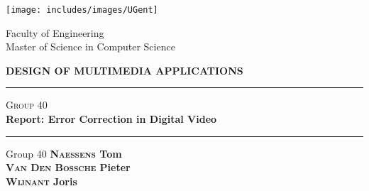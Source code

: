 \begin{titlepage}

\fontsize{12pt}{14pt}
\selectfont

\begin{center}

\texttt{[image: includes/images/UGent]}

\vspace{0.5cm}

Faculty of Engineering\\
Master of Science in Computer Science\\

\vspace{4.0cm}

\fontsize{17.28pt}{21pt}
\selectfont

\textbf{DESIGN OF MULTIMEDIA APPLICATIONS} \\
\vspace{40pt}

\hrule
\vspace{20pt}
\textsc{Group 40}\\
\vspace{10pt}
\textbf{Report: Error Correction in Digital Video}\\
\vspace{20pt}
\hrule

\vspace{25pt}

\fontsize{12pt}{14pt}
\selectfont

\vspace{5.0cm}

\fontsize{12pt}{14pt}
\selectfont

\hspace{0.5cm} Group 40
\textbf{ 
	\hfill\textsc{Naessens} Tom\\
	\hfill\textsc{Van Den Bossche} Pieter\\
	\hfill\textsc{Wijnant} Joris\\
}
\end{center}
\end{titlepage}